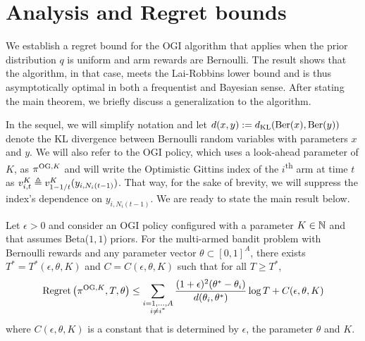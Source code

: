\section{Analysis and Regret bounds} \label{sec:analysis_of_regret}
We establish a regret bound for the OGI algorithm that applies when the prior distribution $q$ is uniform and arm rewards are Bernoulli. The result shows that the algorithm, in that case, meets the Lai-Robbins lower bound and is thus asymptotically optimal in both a frequentist and Bayesian sense. After stating the main theorem, we briefly discuss a generalization to the algorithm.

In the sequel, we will simplify notation  and let $d(x,y) := d_{\rm KL}(\text{Ber}(x),\text{Ber}(y))$ denote the KL divergence between Bernoulli random variables with parameters $x$ and $y$. We will also refer to the OGI policy, which uses a look-ahead parameter of $K$, as $\pi^{{\rm OG},K}$ and will write the Optimistic Gittins index of the $i$\textsuperscript{th} arm at time $t$ as $v^K_{i,t} \triangleq v^K_{1-1/t}(y_{i,N_i(t-1)})$. That way, for the sake of brevity, we will suppress the index's dependence on $y_{i,N_i(t-1)}$. We are ready to state the main result below.
\begin{theorem} \label{thm:frequentist_optimal_bound}
	Let $\epsilon > 0$ and consider an OGI policy configured with a parameter $K \in \mathbb{N}$ and that assumes Beta($1,1$) priors. For the multi-armed bandit problem with Bernoulli rewards and any parameter vector $\theta \subset [0,1]^A$, there exists $T^* = T^*(\epsilon, \theta, K)$ and $C = C(\epsilon,\theta, K)$ such that for all $T \ge T^*$,
	\begin{equation}
	\textnormal{Regret} \left( \pi^{{\rm OG},K}, T, \theta \right) \le \sum_{\substack{i=1,\ldots,A \\ i \ne i^*}} \frac{(1+\epsilon)^2(\theta^* - \theta_i)}{d(\theta_i, \theta^*)} \log T  + C(\epsilon,\theta, K)
	\end{equation}
	where $C(\epsilon,\theta, K)$ is a constant that is determined by $\epsilon$, the parameter $\theta$ and $K$.
\end{theorem}
